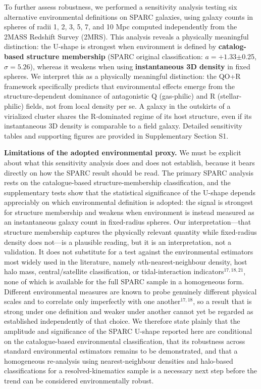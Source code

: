 \documentclass[11pt,a4paper]{article}
\begin{document}
To further assess robustness, we performed a sensitivity analysis testing six alternative environmental definitions on SPARC galaxies, using galaxy counts in spheres of radii 1, 2, 3, 5, 7, and 10 Mpc computed independently from the 2MASS Redshift Survey (2MRS). This analysis reveals a physically meaningful distinction: the U-shape is strongest when environment is defined by \textbf{catalog-based structure membership} (SPARC original classification: $a = +1.33$$\pm$0.25, $\sigma = 5.26$), whereas it weakens when using \textbf{instantaneous 3D density} in fixed spheres. We interpret this as a physically meaningful distinction: the QO+R framework specifically predicts that environmental effects emerge from the structure-dependent dominance of antagonistic Q (gas-philic) and R (stellar-philic) fields, not from local density per se. A galaxy in the outskirts of a virialized cluster shares the R-dominated regime of its host structure, even if its instantaneous 3D density is comparable to a field galaxy. Detailed sensitivity tables and supporting figures are provided in Supplementary Section S1.

\textbf{Limitations of the adopted environmental proxy.} We must be explicit about what this sensitivity analysis does and does not establish, because it bears directly on how the SPARC result should be read. The primary SPARC analysis rests on the catalogue-based structure-membership classification, and the supplementary tests show that the statistical significance of the U-shape depends appreciably on which environmental definition is adopted: the signal is strongest for structure membership and weakens when environment is instead measured as an instantaneous galaxy count in fixed-radius spheres. Our interpretation---that structure membership captures the physically relevant quantity while fixed-radius density does not---is a plausible reading, but it is an interpretation, not a validation. It does not substitute for a test against the environmental estimators most widely used in the literature, namely $n$th-nearest-neighbour density, host halo mass, central/satellite classification, or tidal-interaction indicators$^{17,18,21}$, none of which is available for the full SPARC sample in a homogeneous form. Different environmental measures are known to probe genuinely different physical scales and to correlate only imperfectly with one another$^{17,18}$, so a result that is strong under one definition and weaker under another cannot yet be regarded as established independently of that choice. We therefore state plainly that the amplitude and significance of the SPARC U-shape reported here are conditional on the catalogue-based environmental classification, that its robustness across standard environmental estimators remains to be demonstrated, and that a homogeneous re-analysis using nearest-neighbour densities and halo-based classifications for a resolved-kinematics sample is a necessary next step before the trend can be considered environmentally robust.
\end{document}
